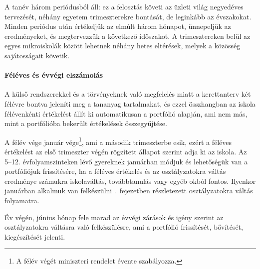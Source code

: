 A tanév három periódusból áll: ez a felosztás követi az üzleti világ negyedéves tervezését, néhány egyetem trimeszterekre bontását, de leginkább az évszakokat. Minden periódus után értékeljük az elmúlt három hónapot, ünnepeljük az eredményeket, és megtervezzük a következő időszakot.  A trimesztereken belül az egyes mikroiskolák között lehetnek néhány hetes eltérések, melyek a közösség sajátosságait követik.

\paragraph{Féléves és évvégi elszámolás}
\label{sec:feleves_bontas}
A külső rendszerekkel és a törvényeknek való megfelelés miatt a kerettanterv két félévre bontva jeleníti meg a tananyag tartalmakat, és ezzel összhangban az iskola félévenkénti értékelést állít ki automatikusan a portfólió alapján, ami nem más, mint a portfólióba bekerült értékelések összegyűjtése.

A félév vége január vége\footnote{A félév végét miniszteri rendelet évente szabályozza.}, ami a második trimeszterbe esik, ezért a féléves értékelést az első trimeszter végén rögzített állapot szerint adja ki az iskola.  Az 5--12. évfolyamszinteken lévő gyereknek januárban módjuk és lehetőségük van a portfóliójuk frissítésére, ha a féléves értékelés és az osztályzatokra váltás eredménye számukra iskolaváltás, továbbtanulás vagy egyéb okból fontos. Ilyenkor januárban alkalmuk van felkészülni .~fejezetben részletezett osztályzatokra váltás folyamatra.

Év végén, június hónap fele marad az évvégi zárások és igény szerint az osztályzatokra váltásra való felkészülésre, ami a portfólió frissítését, bővítését, kiegészítését jelenti.